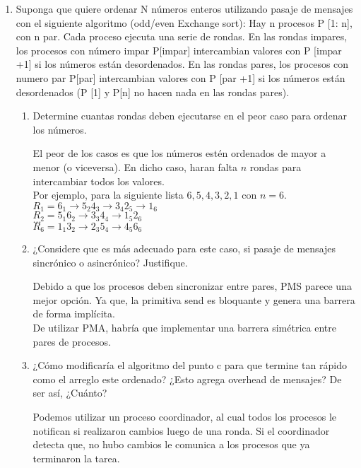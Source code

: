 \documentclass[a4paper, 10pt]{article}
\newenvironment{QandA}{
    \begin{enumerate}\bfseries}
    {\end{enumerate}
}
\newenvironment{answered}{\par\normalfont}{}
\begin{document}
\begin{QandA}
\item Suponga que quiere ordenar N números enteros utilizando pasaje de mensajes con el siguiente algoritmo (odd/even Exchange sort): Hay  n procesos P [1: n], con n par. Cada proceso ejecuta una serie de rondas. En las rondas impares, los procesos con número impar P[impar] intercambian valores con P [impar +1] si los números están desordenados. En las rondas pares, los procesos con numero par P[par] intercambian valores con P [par +1] si los números están desordenados (P [1] y P[n] no hacen nada en las rondas pares).
\begin{enumerate}
\item Determine cuantas rondas deben ejecutarse en el peor caso para ordenar los números.
\begin{answered}
El peor de los casos es que los números estén ordenados de mayor a menor (o viceversa). En dicho caso, haran falta $n$ rondas para intercambiar todos los valores.
\\
Por ejemplo, para la siguiente lista ${6,5,4,3,2,1}$ con $n=6$.
\\
$R_1 = 6_1 \rightarrow 5_2 4_3 \rightarrow 3_4 2_5 \rightarrow 1_6$
\\
$R_2 = 5_1 6_2 \rightarrow 3_3 4_4 \rightarrow 1_5 2_6$
\\
$...$
\\
$R_6 = 1_1 3_2 \rightarrow 2_3 5_4 \rightarrow 4_5 6_6$
\end{answered}
\item ¿Considere que es más adecuado para este caso, si pasaje de mensajes sincrónico o asincrónico? Justifique.
\begin{answered}
Debido a que los procesos deben sincronizar entre pares, PMS parece una mejor opción. Ya que, la primitiva send es bloquante y genera una barrera de forma implícita.
\\
De utilizar PMA, habría que implementar una barrera simétrica entre pares de procesos.
\end{answered}

\item ¿Cómo modificaría el algoritmo del punto c para que termine tan rápido como el arreglo este ordenado? ¿Esto agrega overhead de mensajes? De ser así, ¿Cuánto?
\begin{answered}
Podemos utilizar un proceso coordinador, al cual todos los procesos le notifican si realizaron cambios luego de una ronda. Si el coordinador detecta que, no hubo cambios le comunica a los procesos que ya terminaron la tarea.


\end{answered}
\end{enumerate}
\end{QandA}
\end{document}
